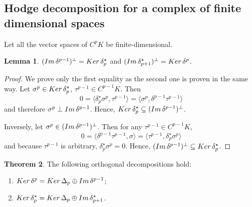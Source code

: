 \documentclass{elsarticle}
\theoremstyle{definition}
\newtheorem{theorem}{Theorem}[section]
\newtheorem{lemma}[theorem]{Lemma}
\newcommand{\inner}[2]{\langle#1,#2\rangle}
\newcommand{\Ker}{\mathop{\rm Ker}\nolimits}
\renewcommand{\Im}{\mathop{\rm Im}\nolimits}
\begin{document}
\subsection{Hodge decomposition for a complex of finite dimensional spaces}
\label{sec:hodge_decomposition}
Let all the vector spaces of $C^p K$ be finite-dimensional.
\begin{lemma}
\label{thm:closed_equals_harmonic_plus_exact}
  $(\Im \delta^{p - 1})^\perp = \Ker \delta^\star_p$ and
  $(\Im \delta^\star_{p + 1})^\perp = \Ker \delta^p$.
\end{lemma}
\begin{proof}
  We prove only the first equality as the second one is proven in the same way. Let $\sigma^p \in \Ker \delta^\star_p$, $\tau^{p - 1} \in C^{p - 1} K$. Then
  \begin{equation}
    0 = \inner{\delta^\star_p \sigma^p}{\tau^{p - 1}} 
      = \inner{\sigma^p}{\delta^{p - 1} \tau^{p - 1}}
  \end{equation}
  and therefore $\sigma^p \perp \Im \delta^{p - 1}$. Hence, 
  $\Ker \delta^\star_p \subseteq (\Im \delta^{p - 1})^\perp$.
	
  Inversely, let $\sigma^p \in (\Im \delta^{p - 1})^\perp$. 
  Then for any $\tau^{p - 1} \in C^{p - 1} K$,
  \begin{equation}
    0 = \inner{\delta^{p - 1} \tau^{p - 1}}{\sigma}
      = \inner{\tau^{p - 1}}{\delta^\star_p \sigma^p}
  \end{equation}
  and because $\tau^{p - 1}$ is arbitrary, $\delta^\star_p \sigma^p = 0$. Hence, $(\Im \delta^{p - 1})^\perp \subseteq \Ker \delta^\star_p$.
\end{proof}
\begin{theorem}
\label{thm:hodge_lemma}
  The following orthogonal decompositions hold:
  \begin{enumerate}
    \item
      $\Ker \delta^p = \Ker \Delta_p \oplus \Im \delta^{p - 1}$;
    \item
      $\Ker \delta^\star_p = \Ker \Delta_p \oplus \Im \delta^\star_{p + 1}$.
  \end{enumerate}
\end{theorem}
\end{document}
